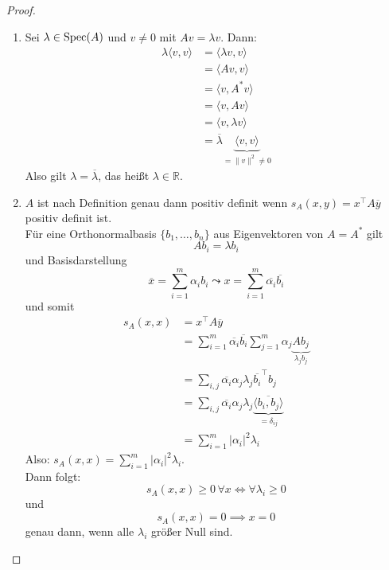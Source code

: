 \documentclass[parskip,a4paper,twoside,DIV15,BCOR12mm]{scrbook}
\begin{document}
\begin{proof}
\begin{enumerate}
\item Sei \(\lambda\in\operatorname{Spec}(A)\) und \(v\neq0\) mit \(Av=\lambda v\). Dann:
\begin{align*}
\lambda\langle v,v\rangle&=\langle\lambda v,v\rangle\\
&=\langle Av,v\rangle\\
&=\langle v,A^{*}v\rangle\\
&=\langle v,Av\rangle\\
&=\langle v,\lambda v\rangle\\
&=\overline{\lambda}\underbrace{\langle v,v\rangle}_{=\lVert v\rVert^{2}\neq0}
\end{align*}
Also gilt \(\lambda=\overline{\lambda}\), das heißt \(\lambda\in\mathbb{R}\).
\item \(A\) ist nach Definition genau dann positiv definit wenn 
\(s_{A}(x,y)=x^{\top}A\overline{y}\) positiv definit ist.\\
Für eine Orthonormalbasis \(\{b_{1},\ldots,b_{n}\}\) aus Eigenvektoren von
\(A=A^{*}\) gilt
\[
Ab_{i}=\lambda b_{i}
\]
und Basisdarstellung
\[
\overline{x}=\sum_{i=1}^{m}{\alpha_{i}b_{i}}\leadsto x=\sum_{i=1}^{m}{\overline{\alpha_{i}}\overline{b_{i}}}
\]
und somit
\begin{align*}
s_{A}(x,x)&=x^{\top}A\overline{y}\\
&=\sum_{i=1}^{m}{\overline{\alpha_{i}}\overline{b_{i}}}\sum_{j=1}^{m}{\alpha_{j}\underbrace{Ab_{j}}_{\lambda_{j}b_{j}}}\\
&=\sum_{i,j}{\overline{\alpha_{i}}\alpha_{j}\lambda_{j}\overline{b_{i}}^{\top}b_{j}}\\
&=\sum_{i,j}{\overline{\alpha_{i}}\alpha_{j}\lambda_{j}\underbrace{\overline{\langle b_{i},b_{j}\rangle}}_{=\delta_{ij}}}\\
&=\sum_{i=1}^{m}\lvert\alpha_{i}\rvert^{2}\lambda_{i}
\end{align*}
Also: \(s_{A}(x,x)=\sum_{i=1}^{m}{\lvert\alpha_{i}\rvert^{2}\lambda_{i}}\).\\
Dann folgt:\\
\[
s_{A}(x,x)\geq0\,\forall x\Longleftrightarrow\forall\lambda_{i}\geq0
\]
und
\[
s_{A}(x,x)=0\implies x=0
\]
genau dann, wenn alle \(\lambda_{i}\) größer Null sind.
\end{enumerate}
\end{proof}
\begin{comment}
Für selbstadjungierte, reelle \(A\) ist die Extravoraussetzung im Spektralsatz
immer erfüllt.
\end{comment}
\end{document}
